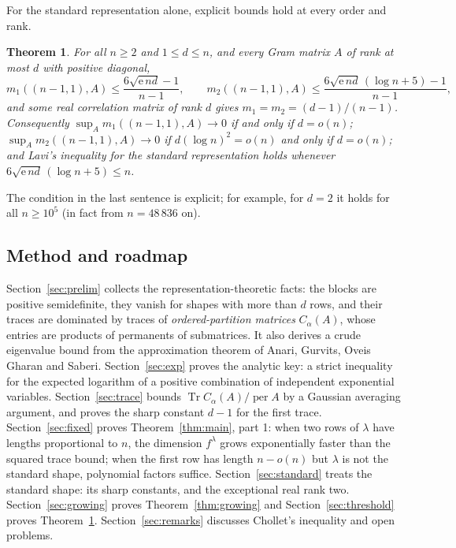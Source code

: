 \documentclass[11pt,a4paper]{article}
\newtheorem{theorem}{Theorem}[section]
\theoremstyle{remark}
\newcommand{\per}{\operatorname{per}}
\newcommand{\Tr}{\operatorname{Tr}}
\begin{document}
For the standard representation alone, explicit bounds hold at every order and rank.
\begin{theorem}\label{thm:standard}
For all $n\ge2$ and $1\le d\le n$, and every Gram matrix $A$ of rank at most $d$ with positive diagonal,
\[
 m_1((n-1,1),A)\le\frac{6\sqrt{\mathrm e\,nd}-1}{n-1},\qquad
 m_2((n-1,1),A)\le\frac{6\sqrt{\mathrm e\,nd}\,(\log n+5)-1}{n-1},
\]
and some real correlation matrix of rank $d$ gives $m_1=m_2=(d-1)/(n-1)$. Consequently $\sup_Am_1((n-1,1),A)\to0$ if and only if $d=o(n)$; $\sup_Am_2((n-1,1),A)\to0$ if $d(\log n)^2=o(n)$ and only if $d=o(n)$; and Lavi's inequality for the standard representation holds whenever $6\sqrt{\mathrm e\,nd}\,(\log n+5)\le n$.
\end{theorem}
The condition in the last sentence is explicit; for example, for $d=2$ it holds for all $n\ge10^5$ (in fact from $n=48\,836$ on).

\subsection{Method and roadmap}
Section~\ref{sec:prelim} collects the representation-theoretic facts: the blocks are positive semidefinite, they vanish for shapes with more than $d$ rows, and their traces are dominated by traces of \emph{ordered-partition matrices} $C_\alpha(A)$, whose entries are products of permanents of submatrices. It also derives a crude eigenvalue bound from the approximation theorem of Anari, Gurvits, Oveis Gharan and Saberi. Section~\ref{sec:exp} proves the analytic key: a strict inequality for the expected logarithm of a positive combination of independent exponential variables. Section~\ref{sec:trace} bounds $\Tr C_\alpha(A)/\per A$ by a Gaussian averaging argument, and proves the sharp constant $d-1$ for the first trace. Section~\ref{sec:fixed} proves Theorem~\ref{thm:main}, part 1: when two rows of $\lambda$ have lengths proportional to $n$, the dimension $f^\lambda$ grows exponentially faster than the squared trace bound; when the first row has length $n-o(n)$ but $\lambda$ is not the standard shape, polynomial factors suffice. Section~\ref{sec:standard} treats the standard shape: its sharp constants, and the exceptional real rank two. Section~\ref{sec:growing} proves Theorem~\ref{thm:growing} and Section~\ref{sec:threshold} proves Theorem~\ref{thm:standard}. Section~\ref{sec:remarks} discusses Chollet's inequality and open problems.
\end{document}
